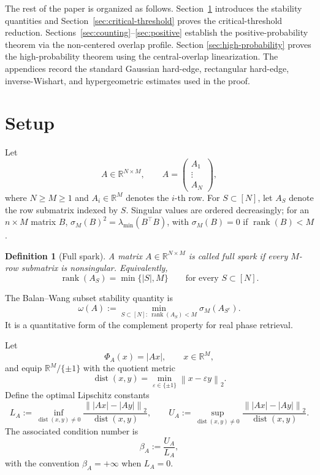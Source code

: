 \documentclass[11pt]{article}
\newtheorem{definition}{Definition}
\DeclareMathOperator{\rank}{rank}
\DeclareMathOperator{\dist}{dist}
\newcommand{\R}{\mathbb R}
\newcommand{\1}{\mathbf 1}
\newcommand{\norm}[1]{\left\lVert #1\right\rVert}
\begin{document}
The rest of the paper is organized as follows. Section~\ref{sec:setup}
introduces the stability quantities and Section~\ref{sec:critical-threshold} proves the critical-threshold
reduction. Sections~\ref{sec:counting}--\ref{sec:positive} establish the
positive-probability theorem via the non-centered overlap profile. Section
\ref{sec:high-probability} proves the high-probability theorem using the
central-overlap linearization. The appendices record the standard Gaussian
hard-edge, rectangular hard-edge, inverse-Wishart, and hypergeometric estimates
used in the proof.

\section{Setup}
\label{sec:setup}

Let
\[
        A\in\R^{N\times M},
        \qquad
        A=\begin{pmatrix}A_1\\ \vdots\\ A_N\end{pmatrix},
\]
where \(N\ge M\ge1\) and \(A_i\in\R^M\) denotes the \(i\)-th row.  For \(S\subset[N]\), let \(A_S\)
denote the row submatrix indexed by \(S\).  Singular values are ordered decreasingly;
for an \(n\times M\) matrix \(B\), \(\sigma_M(B)^2=\lambda_{\min}(B^\top B)\), with
\(\sigma_M(B)=0\) if \(\rank(B)<M\).

\begin{definition}[Full spark]
A matrix \(A\in\R^{N\times M}\) is called full spark if every \(M\)-row submatrix is
nonsingular.  Equivalently,
\[
        \rank(A_S)=\min\{|S|,M\}
        \qquad\text{for every }S\subset[N].
\]
\end{definition}

The Balan--Wang subset stability quantity is
\[
        \omega(A)
        :=
        \min_{S\subset[N]:\ \rank(A_S)<M}
        \sigma_M(A_{S^c}).
\]
It is a quantitative form of the complement property for real phase retrieval.

Let
\[
        \Phi_A(x)=|Ax|,
        \qquad x\in\R^M,
\]
and equip \(\R^M/\{\pm1\}\) with the quotient metric
\[
        \dist(x,y)=\min_{\varepsilon\in\{\pm1\}}\norm{x-\varepsilon y}_2.
\]
Define the optimal Lipschitz constants
\[
        L_A
        :=
        \inf_{\dist(x,y)\ne0}
        \frac{\norm{|Ax|-|Ay|}_2}{\dist(x,y)},
        \qquad
        U_A
        :=
        \sup_{\dist(x,y)\ne0}
        \frac{\norm{|Ax|-|Ay|}_2}{\dist(x,y)}.
\]
The associated condition number is
\[
        \beta_A:=\frac{U_A}{L_A},
\]
with the convention \(\beta_A=+\infty\) when \(L_A=0\).
\end{document}
